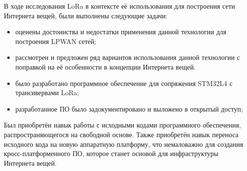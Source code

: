 \Conclusion %

В ходе исследования LoRa в контексте её использования для построения сети 
Интернета вещей, были выполнены следующие задачи:

\begin{itemize}
 \item оценены достоинства и недостатки применения данной технологии для 
построения LPWAN сетей;
 \item рассмотрен и предложен ряд вариантов использования данной технологии с 
поправкой на её особенности в концепции Интернета вещей.
 \item было разработано программное обеспечение для сопряжения STM32L4 с 
трансивервами LoRa;
 \item разработанное ПО было задокументировано и выложено в открытый доступ;
\end{itemize}

Был приобретён навык работы с исходными кодами программного обеспечения, 
распространяющегося на свободной основе.
Также приобретён навык переноса исходного кода на новую аппаратную платформу, 
что немаловажно для создания кросс-платформенного ПО, которое станет основой 
для инфраструктуры Интернета вещей.

